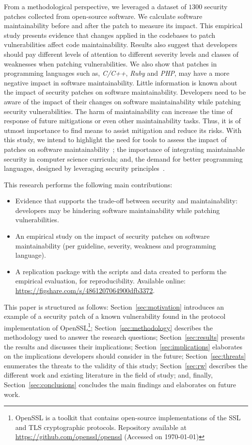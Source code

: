 \documentclass[smallextended]{svjour3}       %
\begin{document}
From a methodological perspective, we leveraged a dataset of $1300$ 
security patches collected from open-source software. We calculate 
software maintainability before and after the patch to measure its 
impact. This empirical study presents evidence that changes applied 
in the codebases to patch vulnerabilities affect code 
maintainability. Results also suggest that developers 
should pay different levels of attention to different severity 
levels and classes of weaknesses when patching vulnerabilities. We 
also show that patches in programming languages such as, 
\emph{C/C++}, \emph{Ruby} and \emph{PHP}, may have a more negative 
impact in software maintainability. Little information is known 
about the impact of security patches on software 
maintainability. Developers need to be aware of the impact of their 
changes on software maintainability while patching security 
vulnerabilities. The harm of maintainability can increase the time 
of response of future mitigations or even other maintainability 
tasks. Thus, it is of utmost importance to find means to assist 
mitigation and reduce its risks. With this study, we intend to 
highlight the need for tools to assess the impact of patches on 
software maintainability~\cite{4724577}; the importance of 
integrating maintainable security in computer science curricula; 
and, the demand for better programming languages, designed by 
leveraging security principles~\cite{kurilova2014wyvern,10.1145/2489828.2489830}. 
 
This research performs the following main contributions:
%
\begin{itemize}
  \item Evidence that supports the trade-off between security and 
  maintainability: developers may be hindering software 
  maintainability while patching vulnerabilities.
	\item An empirical study on the impact of security patches on 
	software maintainability (per guideline, severity, weakness and 
	programming language).
	\item A replication package with the scripts and data created to 
	perform the empirical evaluation, for reproducibility. Available 
	online: \url{https://figshare.com/s/4861207064900dfb3372}.
\end{itemize}
%
This paper is structured as follows: Section~\ref{sec:motivation} 
introduces an example of a security patch of a known vulnerability 
found in the protocol implementation of 
OpenSSL\footnote{\label{openssl}OpenSSL is a toolkit that
contains open-source implementations of the SSL and TLS cryptographic
protocols. Repository available at 
\url{https://github.com/openssl/openssl} (Accessed on \today{})}; 
Section~\ref{sec:methodology} describes the methodology used to 
answer the research questions; Section~\ref{sec:results} presents 
the results and discusses their implications; 
Section~\ref{sec:implications} elaborates on the implications
developers should consider in the future; Section~\ref{sec:threats} 
enumerates the threats to the validity of this study; 
Section~\ref{sec:rw} describes the different work and existing
literature in the field of study; and, finally, 
Section~\ref{sec:conclusions} concludes the main findings and 
elaborates on future work.
\end{document}
